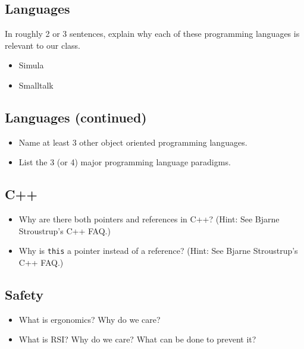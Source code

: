 \subsection*{Languages}
In roughly 2 or 3 sentences, explain why each of these programming languages is
relevant to our class.
\textQuestion{\makeDashedLine}
\begin{itemize}
  \item Simula
    \vfill\textQuestion{\makeDashedLine}
  \item Smalltalk
    \vfill
\end{itemize}

\newpage

\subsection*{Languages (continued)}
\textQuestion{\makeDashedLine}
\begin{itemize}
  \item Name at least 3 other object oriented programming languages.
    \vfill\textQuestion{\makeDashedLine}
  \item List the 3 (or 4) major programming language paradigms.
    \vfill
\end{itemize}

\subsection*{C++}
\textQuestion{\makeDashedLine}
\begin{itemize}
  \item Why are there both pointers and references in C++? (Hint: See Bjarne
    Stroustrup's C++ FAQ.)
    \vfill
    \vfill\textQuestion{\makeDashedLine}
  \item Why is \texttt{this} a pointer instead of a reference? (Hint:
    See Bjarne Stroustrup's C++ FAQ.)
    \vfill
    \vfill
\end{itemize}

\subsection*{Safety}
\textQuestion{\makeDashedLine}
\begin{itemize}
  \item What is ergonomics?  Why do we care?
    \vfill
    \vfill\textQuestion{\makeDashedLine}
  \item What is RSI?  Why do we care?  What can be done to prevent it?
    \vfill
    \vfill
    \vfill
\end{itemize}



